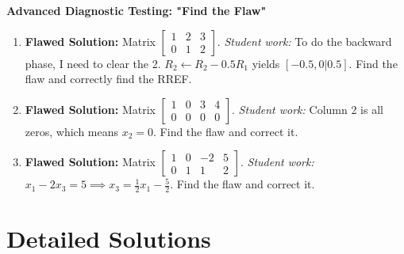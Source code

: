 \documentclass[11pt]{article}
\begin{document}
\textbf{Advanced Diagnostic Testing: "Find the Flaw"}
\begin{enumerate}[label=\textbf{1.2.\arabic*}, resume]
    \item \textbf{Flawed Solution:} Matrix $\left[\begin{array}{cc|c} 1 & 2 & 3 \\ 0 & 1 & 2 \end{array}\right]$. \textit{Student work:} To do the backward phase, I need to clear the 2. $R_2 \leftarrow R_2 - 0.5 R_1$ yields $[-0.5, 0 | 0.5]$. Find the flaw and correctly find the RREF.
    \item \textbf{Flawed Solution:} Matrix $\left[\begin{array}{ccc|c} 1 & 0 & 3 & 4 \\ 0 & 0 & 0 & 0 \end{array}\right]$. \textit{Student work:} Column 2 is all zeros, which means $x_2 = 0$. Find the flaw and correct it.
    \item \textbf{Flawed Solution:} Matrix $\left[\begin{array}{ccc|c} 1 & 0 & -2 & 5 \\ 0 & 1 & 1 & 2 \end{array}\right]$. \textit{Student work:} $x_1 - 2x_3 = 5 \implies x_3 = \frac{1}{2}x_1 - \frac{5}{2}$. Find the flaw and correct it.
\end{enumerate}

\newpage
\section{Detailed Solutions}
\end{document}
